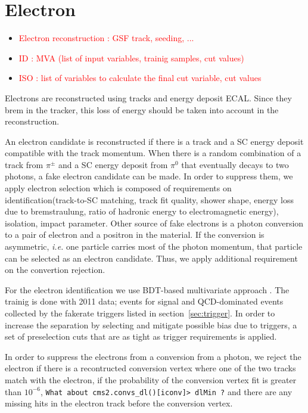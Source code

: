 \section{ Electron }
\begin{itemize}
\item \textcolor{red}{Electron reconstruction : GSF track, seeding, ... }
\item \textcolor{red}{ID  : MVA (list of input variables, trainig samples, cut values)}
\item \textcolor{red}{ISO : list of variables to calculate the final cut variable, cut values  }
\end{itemize}

Electrons are reconstructed using tracks and energy deposit ECAL. 
Since they brem in the tracker, this loss of energy should be taken 
into account in the reconstruction. 

An electron candidate is reconstructed if there is a track and a SC energy deposit
compatible with the track momentum. When there is a random combination of 
a track from $\pi^\pm$ and a SC energy deposit from $\pi^0$ that eventually 
decays to two photons, a fake electron candidate can be made. 
In order to suppress them, we apply electron selection which is composed of 
requirements on identification(track-to-SC matching, 
track fit quality, shower shape, energy loss due to bremstraulung, ratio of hadronic energy
to electromagnetic energy), isolation, impact parameter.  
Other source of fake electrons is a photon conversion to a pair of electron and a positron 
in the material. If the conversion is asymmetric, \textit{i.e.} one particle carries 
most of the photon momentum, that particle can be selected as an electron 
candidate. Thus, we apply additional requirement on the convertion rejection.

For the electron identification we use BDT-based multivariate approach \cite{electronBDT}.  
The trainig is done with 2011 data; \dyll{} events for signal and QCD-dominated events 
collected by the fakerate triggers listed in section~\ref{sec:trigger}. 
In order to increase the separation by selecting and mitigate possible bias 
due to triggers, a set of preselection cuts that are as tight as trigger requirements 
is applied.  


In order to suppress the electrons from a conversion from a photon, we reject the electron 
if there is a recontructed conversion vertex where one of the two tracks match with 
the electron, if the probability of the conversion vertex fit is greater than $10^{-6}$, 
\verb|What about cms2.convs_dl()[iconv]> dlMin ?|  
and there are any missing hits in the electron track before the conversion vertex.   

